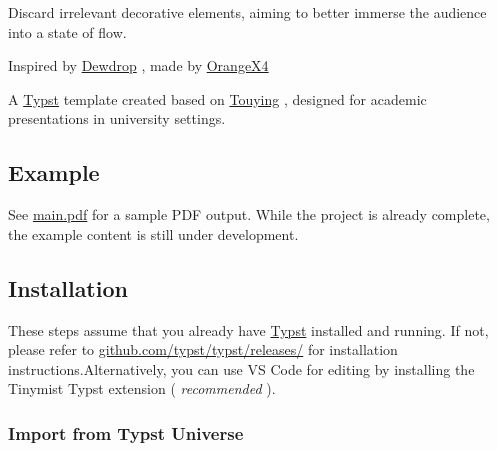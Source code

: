 \label{readme}
Discard irrelevant decorative elements, aiming to better immerse the
audience into a state of flow.

Inspired by \href{https://github.com/touying-typ/touying.git}{Dewdrop} ,
made by \href{https://github.com/OrangeX4}{OrangeX4}

A \href{https://github.com/typst/typst}{Typst} template created based on
\href{https://github.com/touying-typ/touying}{Touying} , designed for
academic presentations in university settings.

\subsection{Example}\label{example}

See
\href{https://github.com/typst/packages/raw/main/packages/preview/touying-flow/1.0.0/main.pdf}{main.pdf}
for a sample PDF output. While the project is already complete, the
example content is still under development.

\subsection{Installation}\label{installation}

These steps assume that you already have
\href{https://typst.app/}{Typst} installed and running. If not, please
refer to
\href{https://github.com/typst/typst/releases/}{github.com/typst/typst/releases/}
for installation instructions.Alternatively, you can use VS Code for
editing by installing the Tinymist Typst extension ( \emph{recommended}
).

\subsubsection{Import from Typst
Universe}\label{import-from-typst-universe}

